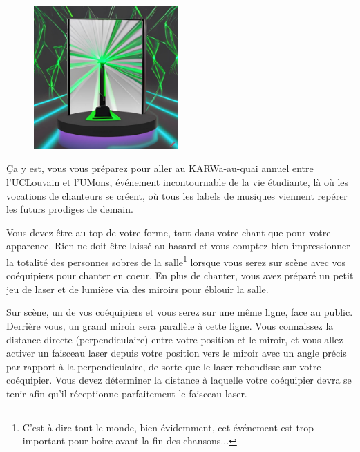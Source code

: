 \problemname{\problemyamlname}

\begin{figure}
    \centering
    \includegraphics[width=5.5cm]{mirror.jpg}
\end{figure}
Ça y est, vous vous préparez pour aller au KARWa-au-quai annuel entre l'UCLouvain et l'UMons, événement incontournable de la vie étudiante, là où les vocations de chanteurs se créent, où tous les labels de musiques viennent repérer les futurs prodiges de demain.

Vous devez être au top de votre forme, tant dans votre chant que pour votre apparence.
Rien ne doit être laissé au hasard et vous comptez bien impressionner la totalité des personnes sobres de la salle\footnote{C'est-à-dire tout le monde, bien évidemment, cet événement est trop important pour boire avant la fin des chansons...} lorsque vous serez sur scène avec vos coéquipiers pour chanter en coeur.
En plus de chanter, vous avez préparé un petit jeu de laser et de lumière via des miroirs pour éblouir la salle.

Sur scène, un de vos coéquipiers et vous serez sur une même ligne, face au public.
Derrière vous, un grand miroir sera parallèle à cette ligne.
Vous connaissez la distance directe (perpendiculaire) entre votre position et le miroir,
et vous allez activer un faisceau laser depuis votre position vers le miroir avec un angle
précis par rapport à la perpendiculaire, de sorte que le laser rebondisse sur votre coéquipier.
Vous devez déterminer la distance à laquelle votre coéquipier devra se tenir afin qu'il réceptionne parfaitement le faisceau laser.

